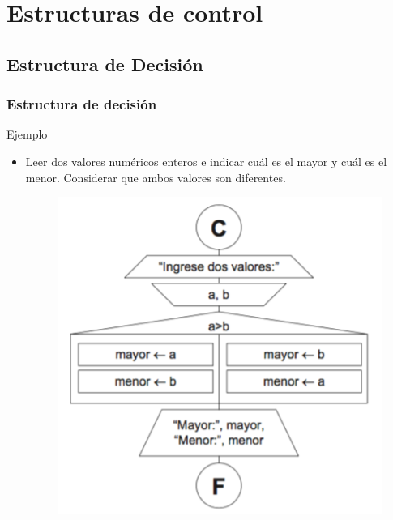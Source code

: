 \documentclass[handout]{beamer}
\begin{document}
\section{Estructuras de control} %
\label{sec:estructuras_de_control}
\subsection{Estructura de Decisión} %
\label{sub:estructura_de_decision}

\begin{frame}[t]\frametitle{Estructura de decisión}
    
Ejemplo
\begin{itemize}
  \item Leer dos valores numéricos enteros e indicar cuál es el mayor y cuál es el menor. Considerar que ambos valores son diferentes.
  \begin{figure}[tb]
     \centering
     \includegraphics[scale=.7]{./img/if}
   \end{figure} 
\end{itemize}


\end{frame}
\end{document}
